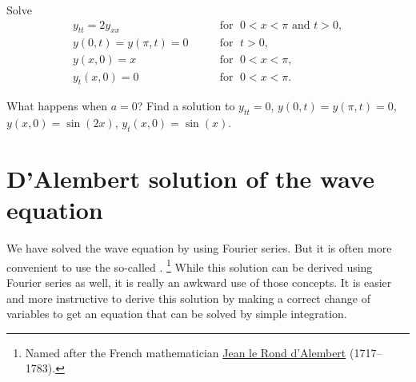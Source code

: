 \begin{exercise}
Solve
\begin{equation*}
\begin{array}{ll}
y_{tt} = 2 y_{xx} & \qquad \text{for } \; 0 < x < \pi \text{ and } t > 0,  \\
y(0,t) = y(\pi,t) = 0 & \qquad \text{for } \; t > 0 , \\
y(x,0) = x & \qquad \text{for } \; 0 < x < \pi , \\
y_t(x,0) = 0 & \qquad \text{for } \; 0 < x < \pi .
\end{array}
\end{equation*}
\end{exercise}
\exsol{%
$
y(x,t)
=
\sum\limits_{n=1}^\infty
\frac{2{(-1)}^{n+1}}{n}
\sin(nx)
\cos( n \sqrt{2}\,t ) 
$
}

\begin{exercise}
What happens when $a=0$?  Find a solution to
$y_{tt} = 0$, $y(0,t) = y(\pi,t) = 0$,
$y(x,0) = \sin(2x)$,
$y_t(x,0) = \sin(x)$.
\end{exercise}


\sectionnewpage
\section{D'Alembert solution of the wave equation}
\label{dalemb:section}



We have solved the wave equation by using Fourier series.  But it is often
more convenient to use the so-called
\emph{}.%
\footnote{Named after the French mathematician
\href{https://en.wikipedia.org/wiki/D\%27Alembert}{Jean le Rond d'Alembert}
(1717--1783).}
While this solution can be derived using Fourier series as well, it
is really an awkward use of those concepts.  It is easier and more
instructive to derive this
solution by making a correct change of variables to get an equation that
can be solved by simple integration.


